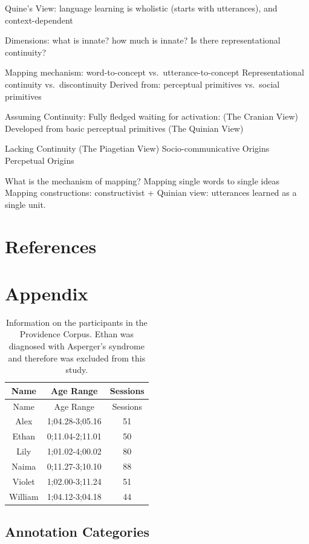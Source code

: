 \documentclass[,man,floatsintext]{apa6}
\begin{document}
Quine's View: language learning is wholistic (starts with utterances), and context-dependent

Dimensions: what is innate? how much is innate? Is there representational continuity?

Mapping mechanism: word-to-concept vs.~utterance-to-concept
Representational continuity vs.~discontinuity
Derived from: perceptual primitives vs.~social primitives

Assuming Continuity:
Fully fledged waiting for activation: (The Cranian View)
Developed from basic perceptual primitives (The Quinian View)

Lacking Continuity (The Piagetian View)
Socio-communicative Origins
Percpetual Origins

What is the mechanism of mapping?
Mapping single words to single ideas
Mapping constructions: constructivist + Quinian view: utterances learned as a single unit.

\newpage

\hypertarget{references}{%
\section{References}\label{references}}

\hypertarget{appendix}{%
\section{Appendix}\label{appendix}}

\begin{longtable}[]{@{}ccc@{}}
\caption{\label{tab:providence} Information on the participants in the Providence Corpus. Ethan was diagnosed with Asperger's syndrome and therefore was excluded from this study.}\tabularnewline
\toprule
Name & Age Range & Sessions\tabularnewline
\midrule
\endfirsthead
\toprule
Name & Age Range & Sessions\tabularnewline
\midrule
\endhead
Alex & 1;04.28-3;05.16 & 51\tabularnewline
Ethan & 0;11.04-2;11.01 & 50\tabularnewline
Lily & 1;01.02-4;00.02 & 80\tabularnewline
Naima & 0;11.27-3;10.10 & 88\tabularnewline
Violet & 1;02.00-3;11.24 & 51\tabularnewline
William & 1;04.12-3;04.18 & 44\tabularnewline
\bottomrule
\end{longtable}

\hypertarget{annotation-categories-1}{%
\subsection{Annotation Categories}\label{annotation-categories-1}}
\end{document}
